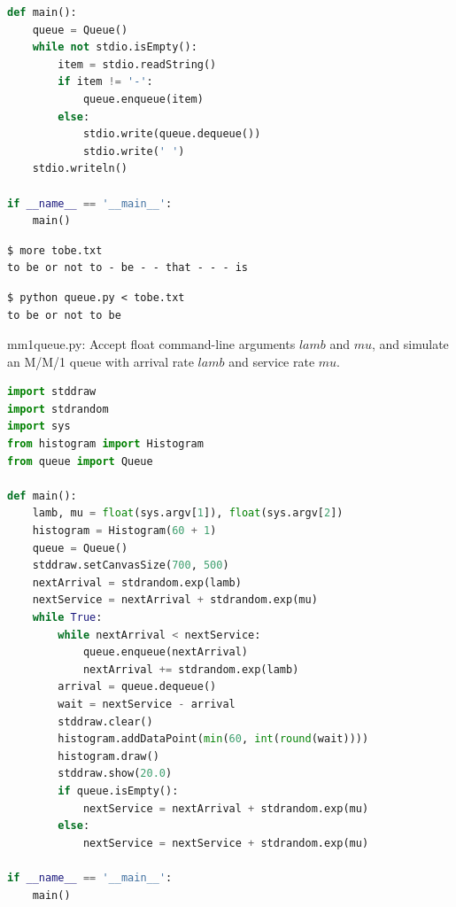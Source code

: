 \documentclass[8pt,a4paper,compress]{beamer}
\begin{document}
\begin{frame}[fragile]
\pause

\begin{lstlisting}[language=Python]
def main():
    queue = Queue()
    while not stdio.isEmpty():
        item = stdio.readString()
        if item != '-':
            queue.enqueue(item)
        else:
            stdio.write(queue.dequeue())
            stdio.write(' ')
    stdio.writeln()

if __name__ == '__main__':
    main()
\end{lstlisting}

\pause

\begin{lstlisting}[language={}]
$ more tobe.txt
to be or not to - be - - that - - - is
\end{lstlisting}

\pause

\begin{lstlisting}[language={}]
$ python queue.py < tobe.txt
to be or not to be
\end{lstlisting}
\end{frame}

\begin{frame}[fragile]
\pause

\begin{framed}
\tiny mm1queue.py: Accept float command-line arguments $lamb$ and $mu$, and simulate an M/M/1 queue with arrival rate $lamb$ and service rate $mu$.
\end{framed}

\begin{lstlisting}[language=Python]
import stddraw
import stdrandom
import sys
from histogram import Histogram
from queue import Queue

def main():
    lamb, mu = float(sys.argv[1]), float(sys.argv[2])
    histogram = Histogram(60 + 1)
    queue = Queue()
    stddraw.setCanvasSize(700, 500)
    nextArrival = stdrandom.exp(lamb)
    nextService = nextArrival + stdrandom.exp(mu) 
    while True:
        while nextArrival < nextService:
            queue.enqueue(nextArrival)
            nextArrival += stdrandom.exp(lamb)
        arrival = queue.dequeue()
        wait = nextService - arrival
        stddraw.clear()
        histogram.addDataPoint(min(60, int(round(wait))))
        histogram.draw()
        stddraw.show(20.0)
        if queue.isEmpty():
            nextService = nextArrival + stdrandom.exp(mu)
        else:
            nextService = nextService + stdrandom.exp(mu)

if __name__ == '__main__':
    main()

\end{lstlisting}
\end{frame}
\end{document}
